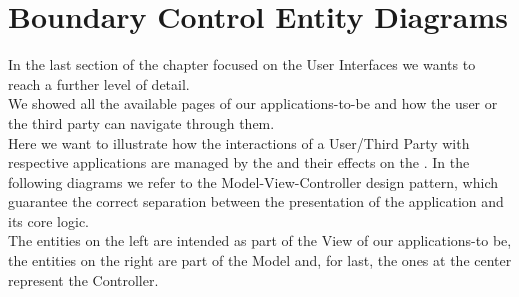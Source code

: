 \section{Boundary Control Entity Diagrams}
In the last section of the chapter focused on the User Interfaces we wants to reach a further level of detail.\\
We showed all the available pages of our applications-to-be and how the user or the third party can navigate through them.\\
Here we want to illustrate how the interactions of a User/Third Party with respective applications are managed by the  and their effects on the .
In the following diagrams we refer to the Model-View-Controller design pattern, which guarantee the correct separation between the presentation of the application and its core logic.\\
The entities on the left are intended as part of the View of our applications-to be, the entities on the right are part of the Model and, for last, the ones at the center represent the Controller.

